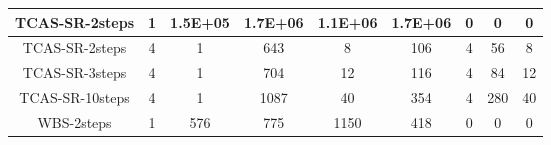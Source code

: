 \begin{table}[]
\begin{tabular}{@{}ccccccccc@{}}
        TCAS-SR-2steps                                              & 1                                                            & 1.5E+05                                                    & 1.7E+06                                                     & 1.1E+06                                                        & 1.7E+06                                                        & 0                                                          & 0                                                             & 0        \\ \midrule
        TCAS-SR-2steps                                              & 4                                                            & 1                                                          & 643                                                         & 8                                                              & 106                                                            & 4                                                          & 56                                                            & 8        \\ \midrule
        TCAS-SR-3steps                                              & 4                                                            & 1                                                          & 704                                                         & 12                                                             & 116                                                            & 4                                                          & 84                                                            & 12       \\ \midrule
        TCAS-SR-10steps                                             & 4                                                            & 1                                                          & 1087                                                        & 40                                                             & 354                                                            & 4                                                          & 280                                                           & 40       \\ \midrule
        WBS-2steps                                                  & 1                                                            & 576                                                        & 775                                                         & 1150                                                           & 418                                                            & 0                                                          & 0                                                             & 0        \\ \midrule

\end{tabular}
\end{table}
